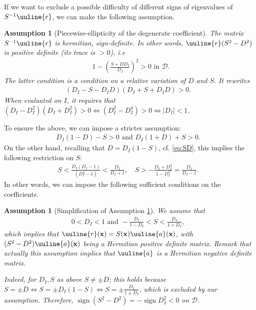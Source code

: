 \documentclass[report]{elsarticle}
\newtheorem{assumption}[theorem]{Assumption}
\numberwithin{theorem}{section}
\renewcommand{\vec}[1]{\mathbf{#1}}
\begin{document}
If we want to exclude a possible difficulty of different signs of eigenvalues of $S^{-1}\uuline{r}$, we can make the following assumption.
\begin{assumption}[Piecewise-ellipticity of the degenerate coefficient]
	\label{assumption:positive_definite_coplex}
	The matrix $S^{-1}\uuline{r}$ is hermitian, sign-definite. In other words, $\uuline{r}(S^2-D^2)$ is positive definite (its trace is $>0$), i.e
	\begin{align*}
		&1-\left(\frac{S+DD_I}{D_I}\right)^2>0 \text{ in }\mathcal{D}.
	\end{align*}
The latter condition is a condition on a relative variation of $D$ and $S$. 
It rewrites 
\begin{align*}
	(D_I-S-D_ID)(D_I+S+D_ID)>0.
\end{align*}
When evaluated on $I$, it requires that $(D_I-D_I^2)(D_I+D_I^2)>0\iff (D_I^2-D_I^4)>0\iff |D_I|<1$.

\end{assumption}
To ensure the above, we can impose a stricter assumption:
\begin{align*}
	D_I(1-D)-S>0 \text{ and }D_I(1+D)+S>0. 
\end{align*}
On the other hand, recalling that $D=D_I(1-S)$, cf. \eqref{eq:SD}, this implies the following restriction on $S$:
\begin{align*}
	S<\frac{D_I(D_I-1)}{(D_I^2-1)}<\frac{D_I}{D_I+1}, \quad S>-\frac{D_I+D_I^2}{1-D_I^2}=\frac{D_I}{D_I-1}.
\end{align*}
In other words, we can impose the following sufficient conditions on the coefficients.
\begin{assumption}[Simplification of Assumption \ref{assumption:positive_definite_coplex}]
	\label{assumption:positive_definite}
	We assume that 
	\begin{align}
	0<D_I<1 \text{ and }-\frac{D_I}{1-D_I}<S<\frac{D_I}{1+D_I},
	\end{align}
which implies that $\uuline{r}(\vec{x})=S(\vec{x})\uuline{a}(\vec{x})$, with $(S^2-D^2)\uuline{a}(\vec{x})$ being a Hermitian positive definite matrix. Remark that actually this assumption implies that $\uuline{a}$ is a Hermitian negative definite matrix. 

Indeed, for $D_I, S$ as above $S\neq \pm D$; this holds because $S=\pm D \iff S=\pm D_I(1-S)\iff S=\pm\frac{D_I}{1\pm D_I}$, which is excluded by our assumption. Therefore, $\operatorname{sign}(S^2-D^2)=-\operatorname{sign}D_I^2<0$ on $\mathcal{D}$. 
\end{assumption}
\end{document}
